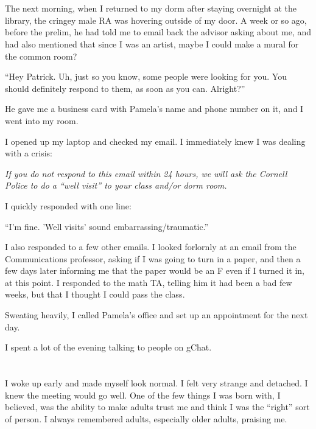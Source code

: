 \section{}

The next morning, when I returned to my dorm after staying overnight at the
library, the cringey male RA was hovering outside of my door.  A week or so ago,
before the prelim, he had told me to email back the advisor asking about me, and
had also mentioned that since I was an artist, maybe I could make a mural for
the common room?

``Hey Patrick.  Uh, just so you know, some people were looking for you.  You
should definitely respond to them, as soon as you can.  Alright?''

He gave me a business card with Pamela's name and phone number on it, and I went
into my room.

I opened up my laptop and checked my email.  I immediately knew I was dealing
with a crisis: 

\textit{If you do not respond to this email within 24 hours, we will ask
the Cornell Police to do a ``well visit'' to your class and/or dorm room.}

I quickly responded with one line:

``I'm fine.  'Well visits' sound embarrassing/traumatic.'' 

I also responded to a few other emails.  I looked forlornly at an email from the
Communications professor, asking if I was going to turn in a paper, and then
a few days later informing me that the paper would be an F even if I turned it
in, at this point.  I responded to the math TA, telling him it had been a bad
few weeks, but that I thought I could pass the class.

Sweating heavily, I called Pamela's office and set up an appointment for the
next day. 

I spent a lot of the evening talking to people on gChat.

\section{}

I woke up early and made myself look normal.  I felt very strange and detached.
I knew the meeting would go well.  One of the few things I was born with, I
believed, was the ability to make adults trust me and think I was the ``right''
sort of person.  I always remembered adults, especially older adults, praising
me.

